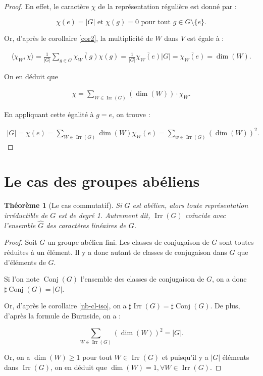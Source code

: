 \documentclass[french]{book}
\newtheorem{prototheorem}{Théorème}[section]
\newenvironment{thm}
   {\colorlet{shadecolor}{orange!10}\begin{shaded}\begin{prototheorem}}
   {\end{prototheorem}\end{shaded}}
\theoremstyle{definition}
\theoremstyle{remark}
\begin{document}
\begin{proof}
  En effet, le caractère \(\chi\) de la représentation régulière est donné par :

  \[\chi(e) = \left\lvert G \right\rvert \text{ et } \chi(g) = 0 \text{ pour tout } g \in G \setminus \{ e \}.\]

  Or, d'après le corollaire \ref{cor2}, la multiplicité de \(W\) dans \(V\) est égale à :

  \begin{gather*}
    \langle \chi_W, \chi \rangle = \frac{1}{\left\lvert G \right\rvert} \sum_{g \in G} \overline{\chi_W(g)} \chi(g) =  \frac{1}{\left\lvert G \right\rvert} \overline{\chi_W(e)} \left\lvert G \right\rvert = \overline{\chi_W(e)} = \operatorname{dim}(W).
  \end{gather*}

  On en déduit que

  \begin{gather*}
    \chi = \sum_{W \in \operatorname{Irr}(G)}(\operatorname{dim}(W)) \cdot \chi_W.
  \end{gather*}

  En appliquant cette égalité à \(g = e\), on trouve :

  \begin{gather*}
    \left\lvert G \right\rvert = \chi(e) = \sum_{W \in \operatorname{Irr}(G)}^{} \operatorname{dim}(W) \chi_W(e) = \sum_{w \in \operatorname{Irr}(G)}^{} (\operatorname{dim}(W))^2.
  \end{gather*}
\end{proof}

\section{Le cas des groupes abéliens}

\begin{thm}[Le cas commutatif]
  Si \(G\) est abélien, alors toute représentation irréductible de \(G\) est de degré 1. Autrement dit, \(\operatorname{Irr}(G)\) co\"incide avec l'ensemble \(\hat{G}\) des caractères linéaires de \(G\).
\end{thm}

\begin{proof}
  Soit \(G\) un groupe abélien fini. Les classes de conjugaison de \(G\) sont toutes réduites à un élément. Il y a donc autant de classes de conjugaison dans \(G\) que d'éléments de \(G\).

  Si l'on note \(\operatorname{Conj}(G)\) l'ensemble des classes de conjugaison de \(G\), on a donc \(\sharp \operatorname{Conj}(G) = \left\lvert G \right\rvert\).

  Or, d'après le corollaire \ref{nb-cl-iso}, on a \(\sharp \operatorname{Irr}(G)= \sharp \operatorname{Conj}(G)\). De plus, d'après la formule de Burnside, on a :

  \[\sum_{W \in \operatorname{Irr}(G)} (\operatorname{dim}(W))^2 = \left\lvert G \right\rvert. \]

  Or, on a \(\operatorname{dim}(W) \geq 1\) pour tout \(W \in \operatorname{Irr}(G)\) et puisqu'il y a \(\left\lvert G \right\rvert\) éléments dans \(\operatorname{Irr}(G)\), on en déduit que \(\operatorname{dim}(W) = 1, \forall W \in \operatorname{Irr}(G)\).
\end{proof}
\end{document}
